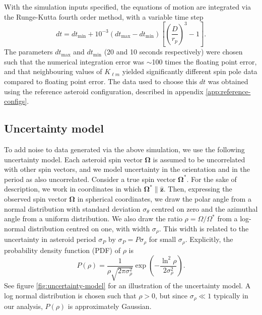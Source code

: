 \documentclass[fleqn,usenatbib]{mnras}
\newcommand{\unit}[1]{\bm{\hat{#1}}}
\newcommand{\parens}[1]{\left( #1 \right)}
\newcommand{\brackets}[1]{\left[ #1 \right]}
\begin{document}
With the simulation inputs specified, the equations of motion are integrated via the Runge-Kutta fourth order method, with a variable time step
\begin{equation}
  dt = dt_\text{min} + 10^{-3}(dt_\text{max} - dt_\text{min}) \brackets{\parens{\frac{D}{r_p}}^3 - 1}.
\end{equation}
The parameters $dt_\text{max}$ and $dt_\text{min}$ (20 and 10 seconds respectively) were chosen such that the numerical integration error was $\sim$100 times the floating point error, and that neighbouring values of $K_{\ell m}$ yielded significantly different spin pole data compared to floating point error. The data used to choose this $dt$ was obtained using the reference asteroid configuration, described in appendix \ref{app:reference-configs}.



\subsection{Uncertainty model}
\label{sec:uncertainty}

To add noise to data generated via the above simulation, we use the following uncertainty model. Each asteroid spin vector $\bm \Omega$ is assumed to be uncorrelated with other spin vectors, and we model uncertainty in the orientation and in the period as also uncorrelated. Consider a true spin vector $\bm \Omega^*$. For the sake of description, we work in coordinates in which $\bm \Omega^* \parallel \unit z$. Then, expressing the observed spin vector $\bm \Omega$ in spherical coordinates, we draw the polar angle from a normal distribution with standard deviation $\sigma_\theta$ centred on zero and the azimuthal angle from a uniform distribution. We also draw the ratio $\rho=\Omega/\Omega^*$ from a log-normal distribution centred on one, with width $\sigma_\rho$. This width is related to the uncertainty in asteroid period $\sigma_P$ by $\sigma_P=P \sigma_\rho$ for small $\sigma_\rho$. Explicitly, the probability density function (PDF) of $\rho$ is 
\begin{equation}
  P(\rho) = \frac{1}{\rho\sqrt{2\pi \sigma_\rho^2}} \exp\parens{-\frac{\ln^2\rho}{2\sigma_\rho^2}}.
\end{equation}
See figure \ref{fig:uncertainty-model} for an illustration of the uncertainty model. A log normal distribution is chosen such that $\rho > 0$, but since $\sigma_\rho \ll 1$ typically in our analysis, $P(\rho)$ is approximately Gaussian.
\end{document}
